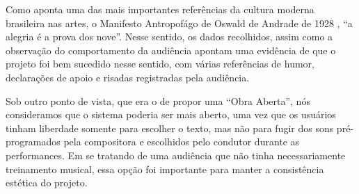 Como aponta uma das mais importantes referências da cultura moderna brasileira nas artes, o Manifesto Antropofágo de Oswald de Andrade de 1928 \cite{Andrade1928}, ``a alegria é a prova dos nove''. Nesse sentido, os dados recolhidos, assim como a observação do comportamento da audiência apontam uma evidência de que o projeto foi bem sucedido nesse sentido, com várias referências de humor, declarações de apoio e risadas registradas pela audiência. 


Sob outro ponto de vista, que era o de propor uma ``Obra Aberta'', nós consideramos que o sistema poderia ser mais aberto, uma vez que os usuários tinham liberdade somente para escolher o texto, mas não para fugir dos sons pré-programados pela compositora e escolhidos pelo condutor durante as performances. Em se tratando de uma audiência que não tinha necessariamente treinamento musical, essa opção foi importante para manter a consistência estética do projeto.






